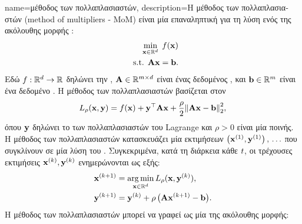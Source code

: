{name={\foreignlanguage{greek}{μέθοδος των πολλαπλασιαστών}},
	description={\foreignlanguage{greek}{Η μέθοδος των πολλαπλασιαστών} 
		\linebreak(method of multipliers - MoM) \foreignlanguage{greek}{είναι μία επαναληπτική}  
		\foreignlanguage{greek}{για τη λύση ενός}   
		\foreignlanguage{greek}{της ακόλουθης μορφής} \cite{DistrOptStatistLearningADMM}:
		\begin{align}
			\min_{\vx \in \mathbb{R}^{\nrfeatures}} \; f(\vx) \nonumber \\ 
			\mbox{ s.t. } \mathbf{A}\vx = \vb. \nonumber
		\end{align}
		\foreignlanguage{greek}{Εδώ $f: \mathbb{R}^{d} \rightarrow \mathbb{R}$ δηλώνει την} 
		, $\mathbf{A} \in \mathbb{R}^{m \times d}$ 
		\foreignlanguage{greek}{εί\-ναι ένας δεδομένος} , \foreignlanguage{greek}{και 
		${\bf b} \in \mathbb{R}^{m}$ είναι ένα δεδομένο} . \foreignlanguage{greek}{Η μέθοδος των 
		πολλαπλασιαστών βασίζεται στον} 
		\[L_\rho(\vx,\vy) = f(\vx) + \vy^\top \mathbf{A}\vx
		+ \frac{\rho}{2}\normgeneric{\mathbf{A}\vx - \vb}{2}^{2},
		\]
		\foreignlanguage{greek}{όπου ${\bf y}$ δηλώνει το}  \foreignlanguage{greek}{των 
		πολλαπλασιαστών του} Lagrange \foreignlanguage{greek}{και $\rho>0$ είναι μία}
		 \foreignlanguage{greek}{ποινής}. \foreignlanguage{greek}{Η μέθοδος 
		των πολλαπλασιαστών κατασκευάζει μία}  \foreignlanguage{greek}{εκτιμήσεων 
		$\left( {\bf x}^{(1)},{\bf y}^{(1)} \right),\,\ldots$ που συγκλίνουν σε μία λύση του} . 
		\foreignlanguage{greek}{Συγκεκριμένα, κατά τη διάρκεια κάθε}  $t$, 
		\foreignlanguage{greek}{οι τρέχουσες εκτιμήσεις ${\bf x}^{(k)},{\bf y}^{(k)}$
		ενημερώνονται ως εξής:}
		\begin{align*} 
			{\bf x}^{(k+1)} &= \operatorname*{arg\,min}_{{\bf x} \in \mathbb{R}^{d}} L_\rho({\bf x},{\bf y}^{(k)}), \\
			{\bf y}^{(k+1)} &= {\bf y}^{(k)} + \rho\, \big(\mathbf{A}{\bf x}^{(k+1)} - {\bf b}\big).
		\end{align*}
		\foreignlanguage{greek}{Η μέθοδος των πολλαπλασιαστών μπορεί να γραφεί ως μία} 
		 \foreignlanguage{greek}{της ακόλουθης μορφής}: 
}}

